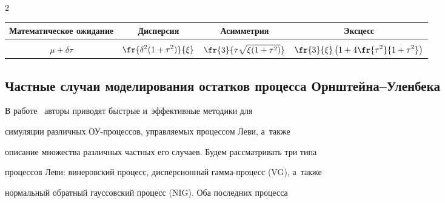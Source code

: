 \begin{multicols}{2}
\begin{table}[b]
\begin{center}
\begin{tabular}{|c|c|c|c|}
                        \hline


                        Математическое ожидание & 


                                                Дисперсия &


                                                                        Асимметрия &


                                    Эксцесс \\


 \hline


 &&&\\[-9pt]


 $\mu + \delta \tau$ &


 $\displaystyle\fr{\delta^2(1 + \tau^2)}{\xi}$ 


& $\displaystyle\fr{3}{\tau \sqrt{\xi (1 + \tau^2)}}$ 


& $\displaystyle\fr{3}{\xi} \left(  1 + 4 \fr{\tau^2}


                        {1 + \tau^2}  \right)$  \\[8pt]


                        \hline


                \end{tabular}


        \end{center}


\end{table}


        





\subsection{Частные случаи моделирования остатков процесса Орнштейна--Уленбека}





В работе~\cite{taufer} авторы приводят быстрые и~эффективные методики для 


симуляции различных ОУ-про\-цес\-сов, управляемых процессом Леви, а~также  


описание множества различных частных его случаев. Будем рассматривать три типа 


процессов Леви: винеровский процесс, дисперсионный гам\-ма-про\-цесс (VG), а~также 


нормальный обратный гауссовский процесс (NIG).  Оба последних процесса 



\end{multicols}
